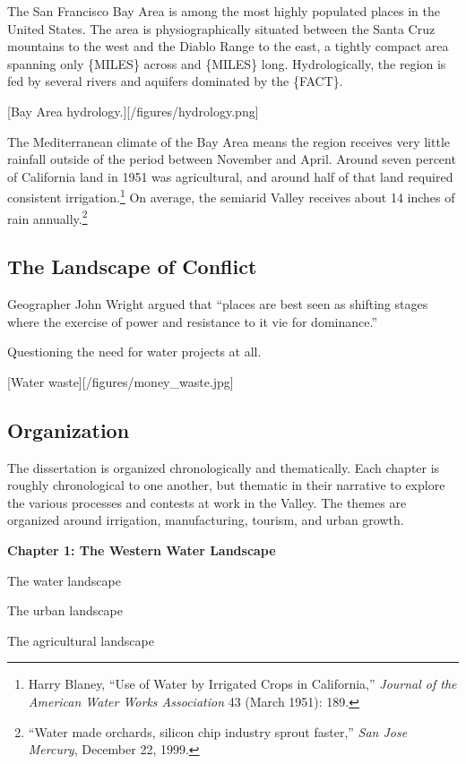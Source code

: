 \documentclass[11pt,article,oneside]{memoir}
\begin{document}
The San Francisco Bay Area is among the most highly populated places in
the United States. The area is physiographically situated between the
Santa Cruz mountains to the west and the Diablo Range to the east, a
tightly compact area spanning only \{MILES\} across and \{MILES\} long.
Hydrologically, the region is fed by several rivers and aquifers
dominated by the \{FACT\}.

{[}Bay Area hydrology.{]}{[}/figures/hydrology.png{]}

The Mediterranean climate of the Bay Area means the region receives very
little rainfall outside of the period between November and April. Around
seven percent of California land in 1951 was agricultural, and around
half of that land required consistent irrigation.\footnote{Harry Blaney,
  ``Use of Water by Irrigated Crops in California,'' \emph{Journal of
  the American Water Works Association} 43 (March 1951): 189.} On
average, the semiarid Valley receives about 14 inches of rain
annually.\footnote{``Water made orchards, silicon chip industry sprout
  faster,'' \emph{San Jose Mercury}, December 22, 1999.}

\subsection{The Landscape of Conflict}

Geographer John Wright argued that ``places are best seen as shifting
stages where the exercise of power and resistance to it vie for
dominance.''

Questioning the need for water projects at all.

{[}Water waste{]}{[}/figures/money\_waste.jpg{]}

\subsection{Organization}

The dissertation is organized chronologically and thematically. Each
chapter is roughly chronological to one another, but thematic in their
narrative to explore the various processes and contests at work in the
Valley. The themes are organized around irrigation, manufacturing,
tourism, and urban growth.

\textbf{Chapter 1: The Western Water Landscape}

The water landscape

The urban landscape

The agricultural landscape
\end{document}
